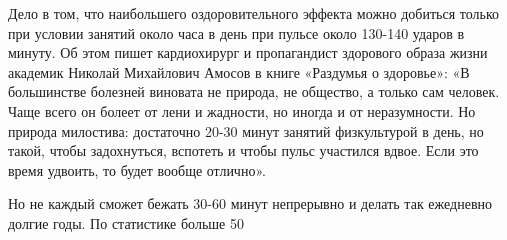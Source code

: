 \documentclass[14pt, a4paper]{article}
\begin{document}
    Дело в том, что наибольшего оздоровительного эффекта можно добиться  только при условии занятий около часа в день при пульсе около 130-140  ударов в минуту. Об этом пишет кардиохирург и пропагандист здорового  образа жизни академик Николай Михайлович Амосов в книге «Раздумья  о  здоровье»: «В большинстве болезней виновата не природа, не общество, а  только сам человек. Чаще всего он болеет от лени и жадности, но иногда и от неразумности. Но природа милостива: достаточно 20-30 минут занятий физкультурой в день, но такой, чтобы задохнуться, вспотеть и чтобы пульс  участился вдвое. Если это время удвоить, то будет вообще отлично».
    
    Но не каждый сможет бежать 30-60 минут непрерывно и делать так ежедневно долгие годы. По статистике больше 50%
    
\end{document}
